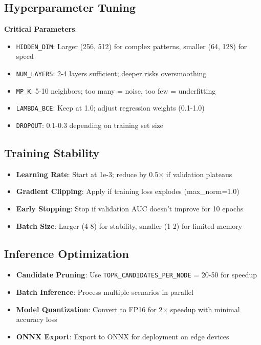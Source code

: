 \documentclass[12pt,a4paper]{article}
\begin{document}
\subsection{Hyperparameter Tuning}

\textbf{Critical Parameters}:
\begin{itemize}
    \item \texttt{HIDDEN\_DIM}: Larger (256, 512) for complex patterns, smaller (64, 128) for speed
    \item \texttt{NUM\_LAYERS}: 2-4 layers sufficient; deeper risks oversmoothing
    \item \texttt{MP\_K}: 5-10 neighbors; too many = noise, too few = underfitting
    \item \texttt{LAMBDA\_BCE}: Keep at 1.0; adjust regression weights (0.1-1.0)
    \item \texttt{DROPOUT}: 0.1-0.3 depending on training set size
\end{itemize}

\subsection{Training Stability}

\begin{itemize}
    \item \textbf{Learning Rate}: Start at 1e-3; reduce by 0.5× if validation plateaus
    \item \textbf{Gradient Clipping}: Apply if training loss explodes (max\_norm=1.0)
    \item \textbf{Early Stopping}: Stop if validation AUC doesn't improve for 10 epochs
    \item \textbf{Batch Size}: Larger (4-8) for stability, smaller (1-2) for limited memory
\end{itemize}

\subsection{Inference Optimization}

\begin{itemize}
    \item \textbf{Candidate Pruning}: Use \texttt{TOPK\_CANDIDATES\_PER\_NODE} = 20-50 for speedup
    \item \textbf{Batch Inference}: Process multiple scenarios in parallel
    \item \textbf{Model Quantization}: Convert to FP16 for 2× speedup with minimal accuracy loss
    \item \textbf{ONNX Export}: Export to ONNX for deployment on edge devices
\end{itemize}
\end{document}
